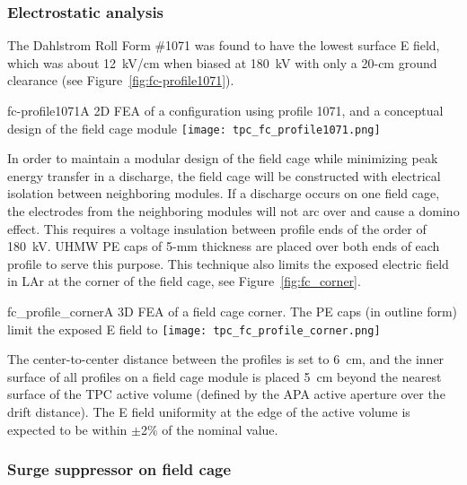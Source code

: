\subsubsection{Electrostatic analysis}

The Dahlstrom Roll Form \#1071 was found to have the lowest surface E field, which was about 12~kV/cm when biased at 180~kV with only a 20-cm ground clearance (see Figure~\ref{fig:fc-profile1071}).

\begin{cdrfigure}{fc-profile1071}{A 2D FEA of a configuration using profile 1071, and a conceptual design of the field cage module}
\texttt{[image: tpc\_fc\_profile1071.png]}
\end{cdrfigure}
  
In order to maintain a modular design of the field cage while minimizing peak energy transfer in a discharge,%
the field cage will be constructed with electrical isolation between neighboring modules. %
If a discharge occurs on one field cage, the %
electrodes from the neighboring modules will not arc over and cause a domino effect.  This requires a %
voltage insulation between profile ends of the order of 180~kV.  UHMW PE caps of 5-mm thickness are placed over both ends of each profile to serve this purpose. This technique also limits the exposed electric field in LAr at the corner of the field cage, see Figure~\ref{fig:fc_corner}. 

\begin{cdrfigure}{fc_profile_corner}{A 3D FEA of a field cage corner.  The PE caps (in outline form) limit the exposed E field to}
\texttt{[image: tpc\_fc\_profile\_corner.png]}
\end{cdrfigure}

The center-to-center distance between the profiles is set to 6~cm, and the inner surface of all profiles on a field cage module is placed 5~cm beyond the nearest surface of the TPC active volume (defined by the APA active aperture over the drift distance). The E field uniformity at the edge of the active volume is expected to be within $\pm$2\% of the nominal value.


\subsubsection{Surge suppressor on field cage}

